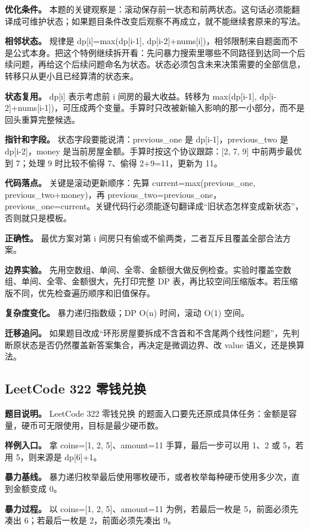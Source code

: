 \textbf{优化条件。} 本题的关键观察是：滚动保存前一状态和前两状态。这句话必须能翻译成可维护状态；如果题目条件改变后观察不再成立，就不能继续套原来的写法。

\textbf{相邻状态。} 规律是 dp[i]=max(dp[i-1], dp[i-2]+nums[i])，相邻限制来自题面而不是公式本身。把这个特例继续拆开看：先问暴力搜索里哪些不同路径到达同一个后续问题，再给这个后续问题命名为状态。状态必须包含未来决策需要的全部信息，转移只从更小且已经算清的状态来。

\textbf{状态复用。} dp[i] 表示考虑前 i 间房的最大收益。转移为 max(dp[i-1], dp[i-2]+nums[i-1])，可压成两个变量。手算时只改被新输入影响的那一小部分，而不是回头重算完整候选。

\textbf{指针和字段。} 状态字段要能说清：previous\_one 是 dp[i-1]，previous\_two 是 dp[i-2]，money 是当前房屋金额。手算时按这个协议跟踪：[2, 7, 9] 中前两步最优到 7；处理 9 时比较不偷得 7、偷得 2+9=11，更新为 11。

\textbf{代码落点。} 关键是滚动更新顺序：先算 current=max(previous\_one, previous\_two+money)，再 previous\_two=previous\_one，previous\_one=current。关键代码行必须能逐句翻译成“旧状态怎样变成新状态”，否则就只是模板。

\textbf{正确性。} 最优方案对第 i 间房只有偷或不偷两类，二者互斥且覆盖全部合法方案。

\textbf{边界实验。} 先用空数组、单间、全零、金额很大做反例检查。实验时覆盖空数组、单间、全零、金额很大，先打印完整 DP 表，再比较空间压缩版本。若压缩版不同，优先检查遍历顺序和旧值保存。

\textbf{复杂度变化。} 暴力递归指数级；DP O(n) 时间，滚动 O(1) 空间。

\textbf{迁移追问。} 如果题目改成“环形房屋要拆成不含首和不含尾两个线性问题”，先判断原状态是否仍然覆盖新答案集合，再决定是微调边界、改 value 语义，还是换算法。

\subsection{LeetCode 322 零钱兑换}

\textbf{题目说明。} LeetCode 322 零钱兑换 的题面入口要先还原成具体任务：金额是容量，硬币可无限使用，目标是最少硬币数。

\textbf{样例入口。} 拿 coins=[1, 2, 5]、amount=11 手算，最后一步可以用 1、2 或 5，若用 5，则来源是 dp[6]+1。

\textbf{暴力基线。} 暴力递归枚举最后使用哪枚硬币，或者枚举每种硬币使用多少次，直到金额变成 0。

\textbf{暴力过程。} 以 coins=[1, 2, 5]、amount=11 为例，若最后一枚是 5，前面必须先凑出 6；若最后一枚是 2，前面必须先凑出 9。

